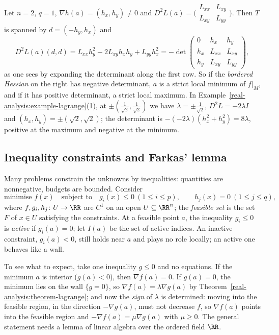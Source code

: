 \begin{example}\label{real-analysis:example-bordered-hessian}
Let $n = 2$, $q = 1$, $\nabla h(a) = (h_x, h_y) \neq 0$ and $D^2L(a) = \bigl(\begin{smallmatrix} L_{xx} & L_{xy}\\ L_{xy} & L_{yy}\end{smallmatrix}\bigr)$. Then $T$ is spanned by $d = (-h_y, h_x)$ and
\[
D^2L(a)(d, d) = L_{xx}h_y^2 - 2L_{xy}h_xh_y + L_{yy}h_x^2 = -\det\begin{pmatrix} 0 & h_x & h_y\\ h_x & L_{xx} & L_{xy}\\ h_y & L_{xy} & L_{yy}\end{pmatrix},
\]
as one sees by expanding the determinant along the first row. So if the \emph{bordered Hessian} on the right has negative determinant, $a$ is a strict local minimum of $f|_M$, and if it has positive
determinant, a strict local maximum. In Example~\ref{real-analysis:example-lagrange}(1), at $\pm(\frac1{\sqrt2}, \frac1{\sqrt2})$ we have $\lambda = \pm\frac1{\sqrt2}$, $D^2L = -2\lambda I$ and
$(h_x, h_y) = \pm(\sqrt2, \sqrt2)$; the determinant is $-(-2\lambda)(h_x^2 + h_y^2) = 8\lambda$, positive at the maximum and negative at the minimum.
\end{example}

\subsection{Inequality constraints and Farkas' lemma}\label{real-analysis:subsection-kkt}

Many problems constrain the unknowns by inequalities: quantities are nonnegative, budgets are bounded. Consider
\begin{equation}\label{real-analysis:equation-nlp}
\text{minimise } f(x) \quad \text{subject to} \quad g_i(x) \leq 0 \ (1 \leq i \leq p), \qquad h_j(x) = 0 \ (1 \leq j \leq q),
\end{equation}
where $f, g_i, h_j \colon U \to \RR$ are $C^1$ on an open $U \subseteq \RR^n$; the \emph{feasible set} is the set $F$ of $x \in U$ satisfying the constraints. At a feasible point $a$, the inequality $g_i \leq 0$
is \emph{active} if $g_i(a) = 0$; let $I(a)$ be the set of active indices. An inactive constraint, $g_i(a) < 0$, still holds near $a$ and plays no role locally; an active one behaves like a wall.

To see what to expect, take one inequality $g \leq 0$ and no equations. If the minimum $a$ is interior ($g(a) < 0$), then $\nabla f(a) = 0$. If $g(a) = 0$, the minimum lies on the wall $\{g = 0\}$, so
$\nabla f(a) = \lambda\nabla g(a)$ by Theorem~\ref{real-analysis:theorem-lagrange}; and now the \emph{sign} of $\lambda$ is determined: moving into the feasible region, in the direction $-\nabla g(a)$, must not
decrease $f$, so $\nabla f(a)$ points into the feasible region and $-\nabla f(a) = \mu\nabla g(a)$ with $\mu \geq 0$. The general statement needs a lemma of linear algebra over the ordered field $\RR$.

